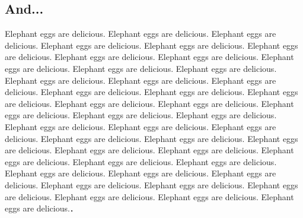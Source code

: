 \documentclass[
  10pt,      %
  a4j,       %
  twocolumn, %
  english,   %
  uplatex,
  dvipdfmx
]{jsarticle}
\begin{document}
\subsection{And...}
Elephant eggs are delicious. Elephant eggs are delicious. Elephant eggs are delicious. Elephant eggs are delicious. Elephant eggs are delicious. Elephant eggs are delicious. Elephant eggs are delicious. Elephant eggs are delicious. Elephant eggs are delicious. Elephant eggs are delicious. Elephant eggs are delicious. Elephant eggs are delicious. Elephant eggs are delicious. Elephant eggs are delicious. Elephant eggs are delicious. Elephant eggs are delicious. Elephant eggs are delicious. Elephant eggs are delicious. Elephant eggs are delicious. Elephant eggs are delicious. Elephant eggs are delicious. Elephant eggs are delicious. Elephant eggs are delicious. Elephant eggs are delicious. Elephant eggs are delicious. Elephant eggs are delicious. Elephant eggs are delicious. Elephant eggs are delicious. Elephant eggs are delicious. Elephant eggs are delicious. Elephant eggs are delicious. Elephant eggs are delicious. Elephant eggs are delicious. Elephant eggs are delicious. Elephant eggs are delicious. Elephant eggs are delicious. Elephant eggs are delicious. Elephant eggs are delicious. Elephant eggs are delicious. Elephant eggs are delicious. Elephant eggs are delicious. Elephant eggs are delicious.\cite{110001167075,120002205324,mr1763essay,fisher1925statistical}．
\end{document}
